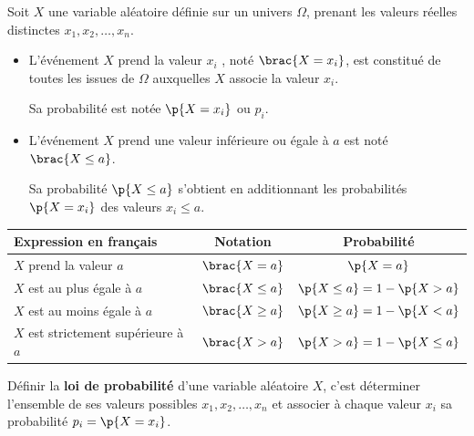 \begin{defin}
	Soit $X$ une variable aléatoire définie sur un univers $\Omega$, prenant les valeurs réelles distinctes $x_1, x_2, \dots, x_n$.

	\begin{itemize}
		\item L'événement \og $X$ prend la valeur $x_i$ \fg{}, noté $\brac{X = x_i}$, est constitué de toutes les issues de $\Omega$ auxquelles $X$ associe la valeur $x_i$.

		      Sa probabilité est notée $\p{X = x_i}$ ou $p_i$.
		\item L'événement \og $X$ prend une valeur inférieure ou égale à $a$ \fg{} est noté $\brac{X \leq a}$.

		      Sa probabilité $\p{X \leq a}$ s'obtient en additionnant les probabilités $\p{X = x_i}$ des valeurs $x_i \leq a$.
	\end{itemize}
\end{defin}

\newpage

\begin{remarque}
	\nline
	\begin{center}
		\begin{tabular}{|l|c|c|} \hline
			\ccg\textbf{Expression en français}            & \ccg\textbf{Notation} & \ccg\textbf{Probabilité}       \\ \hline
			\og $X$ prend la valeur $a$ \fg{}              & $\brac{X = a}$        & $\p{X = a}$                    \\ \hline
			\og $X$ est au plus égale à $a$ \fg{}          & $\brac{X \leq a}$     & $\p{X \leq a} = 1 - \p{X > a}$ \\ \hline
			\og $X$ est au moins égale à $a$ \fg{}         & $\brac{X \geq a}$     & $\p{X \geq a} = 1 - \p{X < a}$ \\ \hline
			\og $X$ est strictement supérieure à $a$ \fg{} & $\brac{X > a}$        & $\p{X > a} = 1 - \p{X \leq a}$ \\ \hline
		\end{tabular}
	\end{center}
\end{remarque}

\begin{defin}
	Définir la \textbf{loi de probabilité} d'une variable aléatoire $X$, c'est déterminer l'ensemble de ses valeurs possibles $x_1, x_2, \dots, x_n$ et associer à chaque valeur $x_i$ sa probabilité $p_i = \p{X = x_i}$.
\end{defin}

